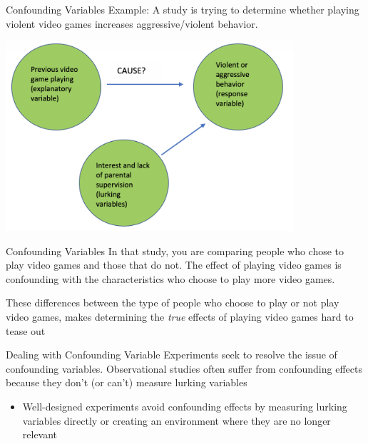 \documentclass{beamer}
\begin{document}
\begin{frame}{Confounding Variables}
	Example: A study is trying to determine whether playing violent video games increases aggressive/violent behavior.
	\begin{center}
		\includegraphics[width=0.8\textwidth]{lurking_example}
	\end{center}
\end{frame}

\begin{frame}{Confounding Variables}
	In that study,  you are comparing people who chose to play video games and those that do not. The effect of playing video games is confounding with the characteristics who choose to play more video games.
	
	These differences between the type of people who choose to play or not play video games, makes determining the \textit{true} effects of playing video games hard to tease out
\end{frame}


\begin{frame}{Dealing with Confounding Variable}
	Experiments seek to resolve the issue of confounding variables. Observational studies often suffer from confounding effects because they don't (or can't) measure lurking variables
	\begin{itemize}
		\item Well-designed experiments avoid confounding effects by measuring lurking variables directly or creating an environment where they are no longer relevant
	\end{itemize}
\end{frame}

\end{document}
